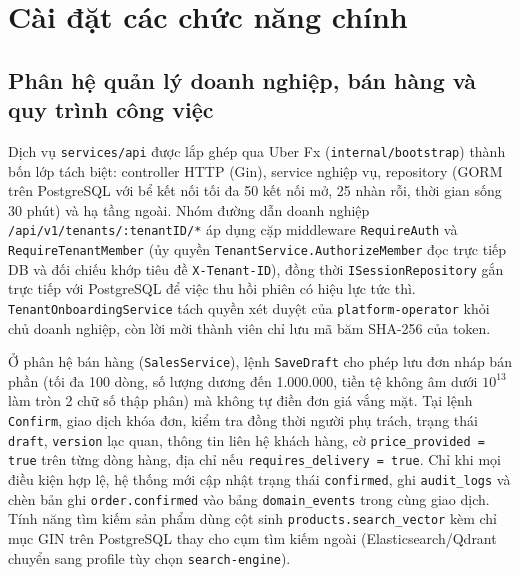 \section{Cài đặt các chức năng chính}
\subsection{Phân hệ quản lý doanh nghiệp, bán hàng và quy trình công việc}
Dịch vụ \texttt{services/api} được lắp ghép qua Uber Fx (\texttt{internal/\hspace{0pt}bootstrap}) thành bốn lớp tách biệt: controller HTTP (Gin), service nghiệp vụ, repository (GORM trên
PostgreSQL với bể kết nối tối đa 50 kết nối mở, 25 nhàn rỗi, thời gian sống 30 phút) và hạ tầng ngoài.
Nhóm đường dẫn doanh nghiệp \texttt{/api/\hspace{0pt}v1/\hspace{0pt}tenants/\hspace{0pt}:tenantID/*} áp dụng cặp middleware \texttt{RequireAuth} và \texttt{RequireTenantMember} (ủy quyền
\texttt{TenantService.\hspace{0pt}AuthorizeMember} đọc trực tiếp DB và đối chiếu khớp tiêu đề \texttt{X-\hspace{0pt}Tenant-\hspace{0pt}ID}), đồng thời \texttt{ISessionRepository} gắn trực tiếp với PostgreSQL để
việc thu hồi phiên có hiệu lực tức thì.
\texttt{TenantOnboardingService} tách quyền xét duyệt của \texttt{platform-\hspace{0pt}operator} khỏi chủ doanh nghiệp, còn lời mời thành viên chỉ lưu mã băm SHA-256 của token.

Ở phân hệ bán hàng (\texttt{SalesService}), lệnh \texttt{SaveDraft} cho phép lưu đơn nháp bán phần (tối đa 100 dòng, số lượng dương đến 1.000.000, tiền tệ không âm dưới
$10^{13}$ làm tròn 2 chữ số thập phân) mà không tự điền đơn giá vắng mặt.
Tại lệnh \texttt{Confirm}, giao dịch khóa đơn, kiểm tra đồng thời người phụ trách, trạng thái \texttt{draft}, \texttt{version} lạc quan, thông tin liên hệ khách hàng, cờ
\texttt{price\_\hspace{0pt}provided = true} trên từng dòng hàng, địa chỉ nếu \texttt{requires\_\hspace{0pt}delivery = true}.
Chỉ khi mọi điều kiện hợp lệ, hệ thống mới cập nhật trạng thái \texttt{confirmed}, ghi \texttt{audit\_\hspace{0pt}logs} và chèn bản ghi \texttt{order.\hspace{0pt}confirmed} vào bảng
\texttt{domain\_\hspace{0pt}events} trong cùng giao dịch.
Tính năng tìm kiếm sản phẩm dùng cột sinh \texttt{products.\hspace{0pt}search\_\hspace{0pt}vector} kèm chỉ mục GIN trên PostgreSQL thay cho cụm tìm kiếm ngoài (Elasticsearch/Qdrant chuyển sang
profile tùy chọn \texttt{search-\hspace{0pt}engine}).

